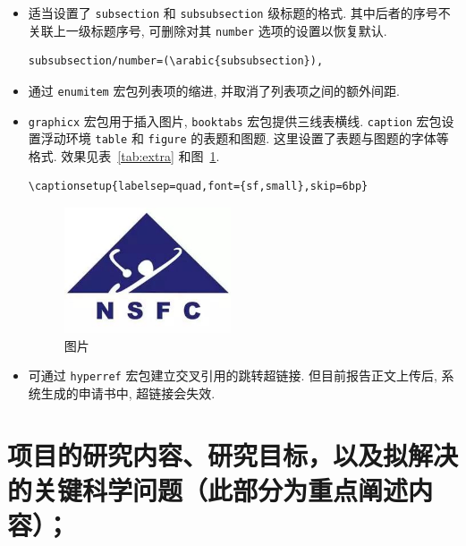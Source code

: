 \documentclass{article}
\begin{document}
\begin{itemize}
  \item
    适当设置了 \verb'subsection' 和 \verb'subsubsection' 级标题的格式.
    其中后者的序号不关联上一级标题序号,
    可删除对其 \verb'number' 选项的设置以恢复默认.
\begin{verbatim}
subsubsection/number=(\arabic{subsubsection}),
\end{verbatim}
  \item
    通过 \verb'enumitem' 宏包列表项的缩进, 并取消了列表项之间的额外间距.
  \item
    \verb'graphicx' 宏包用于插入图片, \verb'booktabs' 宏包提供三线表横线.
    \verb'caption' 宏包设置浮动环境 \verb'table' 和 \verb'figure' 的表题和图题.
    这里设置了表题与图题的字体等格式.
    效果见表~\ref{tab:extra} 和图~\ref{fig:logo}.
\begin{verbatim}
\captionsetup{labelsep=quad,font={sf,small},skip=6bp}
\end{verbatim}
    \begin{figure}[htbp!]
      \centering
      \includegraphics[height=10em]{logo.jpg}
      \caption{图片}
      \label{fig:logo}
    \end{figure}
  \item
    可通过 \verb'hyperref' 宏包建立交叉引用的跳转超链接.
    但目前报告正文上传后, 系统生成的申请书中, 超链接会失效.
\end{itemize}




%
%

\section[项目的研究内容、研究目标，以及拟解决的关键科学问题]
{\textbf{项目的研究内容、研究目标，以及拟解决的关键科学问题}（此部分为重点阐述内容）；}
\end{document}
